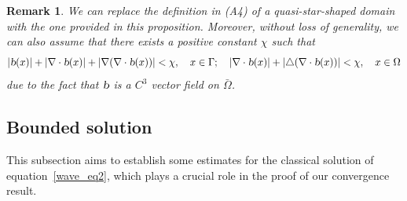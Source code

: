 \documentclass{elsarticle}
\newtheorem{remark}{Remark}[section]
\begin{document}
\begin{remark}
We can replace the definition in {\rm(A4)} of a quasi-star-shaped domain with the one provided in this proposition. Moreover, without loss of generality, we can also assume that there exists a positive constant $\chi$ such that
\begin{equation}\label{qstar_estimate}
|\textsl{b}(x)| + |\nabla\cdot\textsl{b}(x)| + |\nabla(\nabla\cdot\textsl{b}(x))| < \chi, \quad  x\in \Gamma; \quad   |\nabla\cdot\textsl{b}(x)| +|\triangle(\nabla\cdot\textsl{b}(x))|< \chi,  \quad  x\in \Omega
\end{equation}
due to the fact that $\textsl{b}$ is a $C^3$ vector field on $\bar{\Omega}$.
\end{remark}

\subsection{Bounded solution}

This subsection aims to establish some estimates for the classical solution of equation~\eqref{wave_eq2}, which plays a crucial role in the proof of our convergence result.
\end{document}
